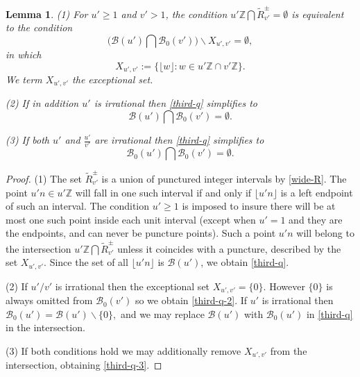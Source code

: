 \documentclass[12pt,letterpaper, reqno]{amsart}
\newtheorem{lem}[thm]{Lemma}
\theoremstyle{definition}
\theoremstyle{remark}
\newcommand{\ZZ}{\ensuremath{\mathbb{Z}}}
\newcommand{\uu}{{u'}}
\newcommand{\vv}{{v'}}
\newcommand{\sB}{{\mathcal B}}
\newcommand{\floor}[1]{\lfloor{#1}\rfloor}
\begin{document}
\begin{lem}\label{lem:53}
(1) For ${\uu} \ge 1$ and  $\vv>1$, the 
condition ${\uu}\ZZ \bigcap \widetilde{R}_\vv^{\pm} = \emptyset$
is equivalent to the condition
 \begin{equation}\label{third-q}
\bigg( \sB({\uu}) \bigcap \sB_0({\vv})\bigg)  \smallsetminus  X_{\uu, \vv} = \emptyset ,
\end{equation}
in which 
\[
X_{\uu, \vv} := \{ \floor{ w } :  w \in {\uu} \ZZ \cap {\vv} \ZZ \}.
\] 
We term $X_{\uu,\vv}$ the  exceptional set.

(2) If in addition $\uu$ is irrational then \eqref{third-q}
simplifies to
\begin{equation} \label{third-q-2}
\sB({\uu}) \bigcap \sB_0({\vv}) =\emptyset.
\end{equation}

(3) If both $\uu$ and $\frac{\uu}{\vv}$ are irrational then \eqref{third-q} simplifies to 
\begin{equation} \label{third-q-3}
\sB_0({\uu}) \bigcap \sB_0({\vv}) =\emptyset.
\end{equation}
\end{lem}

\begin{proof}
(1) 
The set $\widetilde{R}_\vv^{\pm}$ is a union of punctured integer intervals by \eqref{wide-R}.
The point  ${\uu}n \in {\uu}\ZZ$ will fall in one such interval if and only if $\floor {\uu n }$
is a left endpoint of such an interval. The condition ${\uu} \ge 1$ is imposed to insure there will be at
most one such point inside each unit interval (except when ${\uu} =1$ and they are the endpoints,
and can never be puncture points).
Such a point ${\uu}n$ will belong to the intersection
${\uu}\ZZ \bigcap \widetilde{R}_\vv^{\pm}$
unless it coincides with  a puncture, described by   the set $X_{\uu,\vv}$.
Since the  set of all $\floor {\uu n }$ is $\sB({\uu} )$, we obtain  \eqref{third-q}.

(2) If $\uu/\vv$ is irrational then the exceptional set $X_{\uu,\vv} = \{ 0\}$.
However $\{0\}$ is always omitted from $\sB_0({\vv})$ so we  obtain \eqref{third-q-2}.
If  ${\uu}$ is irrational then $\sB_0({\uu}) = \sB({\uu}) \smallsetminus \{ 0\},$
and  we  may replace $\sB({\uu})$ with $\sB_0({\uu})$ in \eqref{third-q}
in the intersection.

(3)  If both conditions hold we may additionally remove $X_{\uu, \vv}$ from
the intersection, obtaining \eqref{third-q-3}.
\end{proof}
\end{document}
